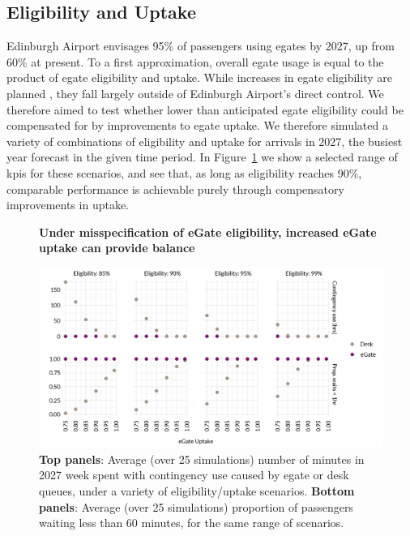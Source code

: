 \documentclass[10pt]{article}
\newcommand*{\figuretitle}[1]{%
    {\centering%
    \textbf{#1}%
    \par\medskip}%
}
\begin{document}
\subsection{Eligibility and Uptake}
Edinburgh Airport envisages 95\% of passengers using \glspl{egate} by 2027, up from 60\% at present. To a first approximation, overall \gls{egate} usage is equal to the product of \gls{egate} eligibility and uptake. While increases in \gls{egate} eligibility are planned \cite{UK_border_2025}, they fall largely outside of Edinburgh Airport's direct control. We therefore aimed to test whether lower than anticipated \gls{egate} eligibility could be compensated for by improvements to \gls{egate} uptake. We therefore simulated a variety of combinations of eligibility and uptake for arrivals in 2027, the busiest year forecast in the given time period. In Figure~\ref{fig:robustness_fig} we show a selected range of \glspl{kpi} for these scenarios, and see that, as long as eligibility reaches 90\%, comparable performance is achievable purely through compensatory improvements in uptake.

\begin{figure}[!ht]
    \centering
    \figuretitle{Under misspecification of eGate eligibility, increased eGate uptake can provide balance}
    \includegraphics[width=\textwidth]{figures/robustness_fig.png}
     \caption{\textbf{Top panels}: Average (over 25 simulations) number of minutes in 2027 week spent with contingency use caused by \gls{egate} or desk queues, under a variety of eligibility/uptake scenarios. \textbf{Bottom panels}: Average (over 25 simulations) proportion of passengers waiting less than 60 minutes, for the same range of scenarios.} \label{fig:robustness_fig}
\end{figure}
\end{document}
